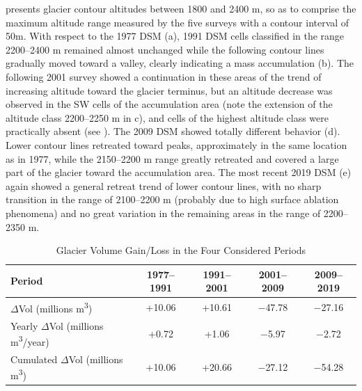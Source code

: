 {{ presents glacier contour altitudes between 1800 and 2400 m, so as to comprise the maximum altitude range measured by the five surveys with a contour interval of 50m.
With respect to the 1977 DSM (a), 1991 DSM cells classified in the range 2200–2400 m remained almost unchanged while the following contour lines gradually moved toward a valley, clearly indicating a mass accumulation (b).
The following 2001 survey showed a continuation in these areas of the trend of increasing altitude toward the glacier terminus, but an altitude decrease was observed in the SW cells of the accumulation area (note the extension of the altitude class 2200–2250 m in c), and cells of the highest altitude class were practically absent (see ). 
The 2009 DSM showed totally different behavior (d). 
Lower contour lines retreated toward peaks, approximately in the same location as in 1977, while the 2150–2200 m range greatly retreated and covered a large part of the glacier toward the accumulation area.
The most recent 2019 DSM (e) again showed a general retreat trend of lower contour lines, with no sharp transition in the range of 2100–2200 m (probably due to high surface ablation phenomena) and no great variation in the remaining areas in the range of 2200–2350 m.

\begin{table}[ht]
  \centering
  \caption{Glacier Volume Gain/Loss in the Four Considered Periods}
  \label{tab:2:glacier_volume_variations}
  \begin{tabular}{lcccc}
    \hline
    Period & 1977--1991 & 1991--2001 & 2001--2009 & 2009--2019 \\
    \hline
    $\Delta$Vol (millions m\textsuperscript{3}) & +10.06 & +10.61 & $-$47.78 & $-$27.16 \\
    Yearly $\Delta$Vol (millions m\textsuperscript{3}/year) & +0.72 & +1.06 & $-$5.97 & $-$2.72 \\
    Cumulated $\Delta$Vol (millions m\textsuperscript{3}) & +10.06 & +20.66 & $-$27.12 & $-$54.28 \\
    \hline
  \end{tabular}
\end{table}

}}
